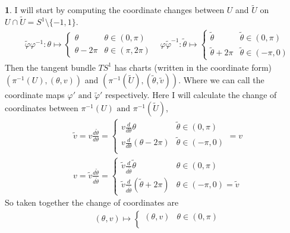 \documentclass[10.5pt]{article}
\theoremstyle{definition}
\newtheorem{pb}{}
\newcommand{\set}[1]{\{#1\}}
\newcommand{\tand}{\text{ and }}
\newcommand{\vp}{\varphi}
\begin{document}
    \begin{pb}
        I will start by computing the coordinate changes between \(U\) and \(\tilde{U}\) on \(U \cap \tilde{U} = S^1 \setminus \set{-1,1}\).
        \begin{align*}
            &\tilde{\vp}\vp^{-1}: \theta \mapsto \begin{cases}
                \theta & \theta \in (0,\pi) \\
                \theta - 2\pi & \theta \in (\pi,2\pi)
            \end{cases}
            &\vp \tilde{\vp}^{-1}: \tilde{\theta} \mapsto \begin{cases}
                \tilde{\theta} & \tilde{\theta} \in (0, \pi) \\
                \tilde{\theta} + 2\pi & \tilde{\theta} \in (-\pi,0)
            \end{cases}
        \end{align*}
        Then the tangent bundle \(TS^1\) has charts (written in the coordinate form) 
        \((\pi^{-1}(U),(\theta,v))\) and \((\pi^{-1}(\tilde{U}),(\tilde{\theta},\tilde{v}))\).
        Where we can call the coordinate maps \(\vp' \tand \tilde{\vp}'\) respectively. Here I will calculate the change of coordinates between \(\pi^{-1}(U) \tand \pi^{-1}(\tilde{U})\),
        \begin{align*}
            &\tilde{v} = v\frac{d \tilde{\theta}}{d \theta} = \begin{cases}
                v\frac{d}{d\theta} \theta & \tilde{\theta} \in (0,\pi)\\
                v\frac{d}{d\theta} (\theta - 2\pi) & \tilde{\theta} \in (-\pi,0)\\
            \end{cases} = v \\
            &v = \tilde{v}\frac{d \tilde{\theta}}{d \tilde{\theta}} = \begin{cases}
                \tilde{v}\frac{d}{d\tilde{\theta}} \tilde{\theta} & \theta \in (0,\pi) \\
                \tilde{v}\frac{d}{d\tilde{\theta}} (\tilde{\theta} + 2\pi) & \theta \in (-\pi,0) = \tilde{v}
            \end{cases}
        \end{align*}
        So taken together the change of coordinates are 
        \begin{align*}
            &(\theta,v) \mapsto \begin{cases}
                (\theta,v) & \theta \in (0,\pi) \\

\end{cases}
\end{align*}
\end{pb}
\end{document}
